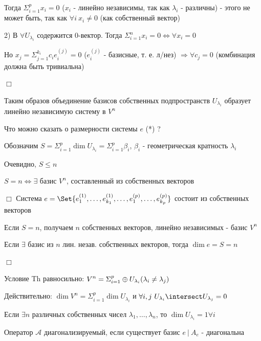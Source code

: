 \documentclass[12pt]{article}
\begin{document}
    Тогда $\displaystyle \Sigma_{i=1}^p x_i = 0$ ($\displaystyle x_i$ - линейно независимы, так как $\displaystyle \lambda_i$ - различны) - этого не может быть, так как $\displaystyle \forall i \ x_i \neq 0$ (как собственный вектор)

    2) В $\displaystyle \forall U_{\lambda_i}$ содержится $0$-вектор. Тогда $\displaystyle \Sigma_{i=1}^n x_i = 0 \Longleftrightarrow \forall x_i = 0$

    Но $\displaystyle x_j = \Sigma_{j=1}^{k_i} c_i e^{(j)}_i = 0$ ($\displaystyle e^{(j)}_i$ - базисные, т. е. л/нез) $\displaystyle \Longrightarrow \forall c_j = 0$ (комбинация должна быть тривиальна)

    $\Box$

    \Nota Таким образов объединение базисов собственных подпространств $\displaystyle U_{\lambda_i}$ образует линейно независимую систему в $\displaystyle V^n$

    Что можно сказать о размерности системы $e$ (*) ?

    Обозначим $\displaystyle S = \Sigma_{i=1}^p \dim U_{\lambda_i} = \Sigma_{i=1}^p \beta_i$, $\displaystyle \beta_i$ - геометрическая кратность $\displaystyle \lambda_i$

    Очевидно, $S \leq n$

    \Th $S = n \Longleftrightarrow \exists$ базис $\displaystyle V^n$, составленный из собственных векторов

    $\Box$ Система $\displaystyle e = \Set{e^{(1)}_1, \dots, e^{(1)}_{k_1}, \dots, e^{(p)}_1, \dots, e^{(p)}_{k_p}}$ состоит из собственных векторов

    Если $S = n$, получаем $n$ собственных векторов, линейно независимых - базис $\displaystyle V^n$

    Если $\exists$ базис из $n$ лин. незав. собственных векторов, тогда $\dim e = S = n$

    $\Box$

    \Nota Условие Th равносильно: $\displaystyle V^n = \Sigma_{i=1}^p \oplus U_{\lambda_i} (\lambda_i \neq \lambda_j)$

    Действительно: $\displaystyle \dim V^n = \Sigma_{i=1}^p \dim U_{\lambda_i}$ и $\displaystyle \forall i, j \ U_{\lambda_i} \intersect U_{\lambda_j} = 0$

    \Ex Если $\exists n$ различных собственных чисел $\displaystyle \lambda_1, \dots, \lambda_n$, то $\displaystyle \dim U_{\lambda_i} = 1 \forall i$

    \Def Оператор $\mathcal{A}$ диагонализируемый, если существует базис $\displaystyle e \ | \ A_e$ - диагональна
\end{document}
